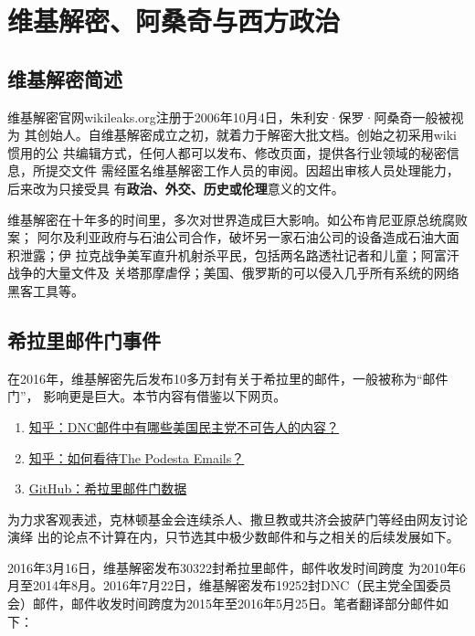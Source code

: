 \chapter{维基解密、阿桑奇与西方政治}

\section{维基解密简述}

维基解密官网wikileaks.org注册于2006年10月4日，朱利安·保罗·阿桑奇一般被视为
其创始人。自维基解密成立之初，就着力于解密大批文档。创始之初采用wiki惯用的公
共编辑方式，任何人都可以发布、修改页面，提供各行业领域的秘密信息，所提交文件
需经匿名维基解密工作人员的审阅。因超出审核人员处理能力，后来改为只接受具
有\textbf{政治、外交、历史或伦理}意义的文件。

维基解密在十年多的时间里，多次对世界造成巨大影响。如公布肯尼亚原总统腐败案；
阿尔及利亚政府与石油公司合作，破坏另一家石油公司的设备造成石油大面积泄露；伊
拉克战争美军直升机射杀平民，包括两名路透社记者和儿童；阿富汗战争的大量文件及
关塔那摩虐俘；美国、俄罗斯的可以侵入几乎所有系统的网络黑客工具等。

\section{希拉里邮件门事件}
\label{sec:podestamail}

在2016年，维基解密先后发布10多万封有关于希拉里的邮件，一般被称为“邮件门”，
影响更是巨大。本节内容有借鉴以下网页。
\begin{enumerate}
\item \href{https://www.zhihu.com/question/41676600}{知乎：DNC邮件中有哪些美国民主党不可告人的内容？}

\item \href{https://www.zhihu.com/question/51362588}{知乎：如何看待The Podesta Emails？}

\item \href{https://github.com/zhouningyi/us_selection_crack}{GitHub：希拉里邮件门数据}
\end{enumerate}


为力求客观表述，克林顿基金会连续杀人、撒旦教或共济会披萨门等经由网友讨论演绎
出的论点不计算在内，只节选其中极少数邮件和与之相关的后续发展如下。

2016年3月16日，维基解密发布30322封希拉里邮件，邮件收发时间跨度
为2010年6月至2014年8月。2016年7月22日，维基解密发布19252封DNC（民主党全国委员
会）邮件，邮件收发时间跨度为2015年至2016年5月25日。笔者翻译部分邮件如下：

